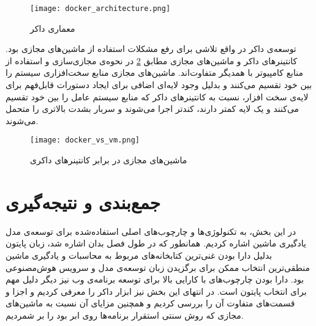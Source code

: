 \begin{figure}[!h]
\centerline{\texttt{[image: docker\_architecture.png]}}
\caption{معماری داکر\cite{dockerDockerOverview}}
\label{fig:docker_architecture}
\end{figure}

توسعه‌ی داکر در واقع تلاشی برای رفع مشکلات استفاده از ماشین‌های مجازی بود. کانتینرهای داکر و ماشین‌های مجازی مطابق \cref{fig:docker_vs_vm} در نحوه‌ی مجازی‌سازی و استفاده از منابع کامپیوتر با همدیگر متفاوت‌اند. ماشین‌های مجازی منابع سخت‌افزاری سیستم را بین خود تقسیم می‌کنند و بدلیل وجود لایه‌ای اضافی برای ایجاد دستورات قابل‌فهم برای لایه‌ی سخت افزار، نسبت به کانتینرهای داکر که منابع سیستم عامل را بین خود تقسیم می‌کنند و یک لایه کمتر دارند، کندتر اجرا می‌شوند و سربار بشدت بالاتری را متحمل می‌شوند\cite{anderson2015docker, yadav2019docker}.

\begin{figure}[!h]
\centerline{\texttt{[image: docker\_vs\_vm.png]}}
\caption{ماشین‌های مجازی در برابر کانتینرهای داکری\cite{yadav2019docker}}
\label{fig:docker_vs_vm}
\end{figure}

\section{جمع‌بندی و نتیجه‌گیری}
در این بخش، به تکنولوژی‌ها و چارچوب‌های اصلی استفاده‌شده برای توسعه‌ی مدل یادگیری ماشین اشاره کردیم. همانطور که در طول فصل بدان اشاره شد، زبان پایتون بدلیل دارا بودن غنی‌ترین کتابخانه‌های مربوط به محاسبات و یادگیری ماشین منطقی‌ترین انتخاب ممکن برای برگزیدن زبان توسعه‌ی مدل و سرویس هوش‌مصنوعی بود. دارا بودن چارچوب‌های با کارایی بالا برای توسعه برنامه‌ی وب نیز دیگر دلیل مهم برای انتخاب پایتون است. در انتهای این بخش نیز ابزار داکر را معرفی کردیم و اجزا و قسمت‌های متفاوت آن را بررسی کردیم و همچنین مزایای آن نسبت به ماشین‌های مجازی که روش سنتی استقرار برنامه‌ها روی ابر بود را بر شمردیم.  